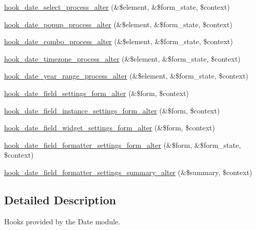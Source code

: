 \begin{DoxyCompactItemize}
\item 
\hyperlink{date_8api_8php_a0688e456a52d3e4bdaaa63337d49e74c}{hook\_\-date\_\-select\_\-process\_\-alter} (\&\$element, \&\$form\_\-state, \$context)
\item 
\hyperlink{date_8api_8php_a8b0b96439de62930ff766eb159d044cb}{hook\_\-date\_\-popup\_\-process\_\-alter} (\&\$element, \&\$form\_\-state, \$context)
\item 
\hyperlink{date_8api_8php_abbae4e6ce7b9d70996e06174fc11497c}{hook\_\-date\_\-combo\_\-process\_\-alter} (\&\$element, \&\$form\_\-state, \$context)
\item 
\hyperlink{date_8api_8php_a7072a26bebd7c6cbdc660a77a79ef3e2}{hook\_\-date\_\-timezone\_\-process\_\-alter} (\&\$element, \&\$form\_\-state, \$context)
\item 
\hyperlink{date_8api_8php_ad2c977542770de5a0d5e170ecc5a0052}{hook\_\-date\_\-year\_\-range\_\-process\_\-alter} (\&\$element, \&\$form\_\-state, \$context)
\item 
\hyperlink{date_8api_8php_a109a61aa1f6183f9431a4b8e1b929e0b}{hook\_\-date\_\-field\_\-settings\_\-form\_\-alter} (\&\$form, \$context)
\item 
\hyperlink{date_8api_8php_a4dcd88abb62128ef8e63f5d2163f46b3}{hook\_\-date\_\-field\_\-instance\_\-settings\_\-form\_\-alter} (\&\$form, \$context)
\item 
\hyperlink{date_8api_8php_a0c2475c846f8750a83b95ea852bf42cf}{hook\_\-date\_\-field\_\-widget\_\-settings\_\-form\_\-alter} (\&\$form, \$context)
\item 
\hyperlink{date_8api_8php_a8100fc54aa7868fa781c96c8b99f2026}{hook\_\-date\_\-field\_\-formatter\_\-settings\_\-form\_\-alter} (\&\$form, \&\$form\_\-state, \$context)
\item 
\hyperlink{date_8api_8php_a8448df9f491a337e9da8ec9157934107}{hook\_\-date\_\-field\_\-formatter\_\-settings\_\-summary\_\-alter} (\&\$summary, \$context)
\end{DoxyCompactItemize}


\subsection{Detailed Description}
Hooks provided by the Date module. 

